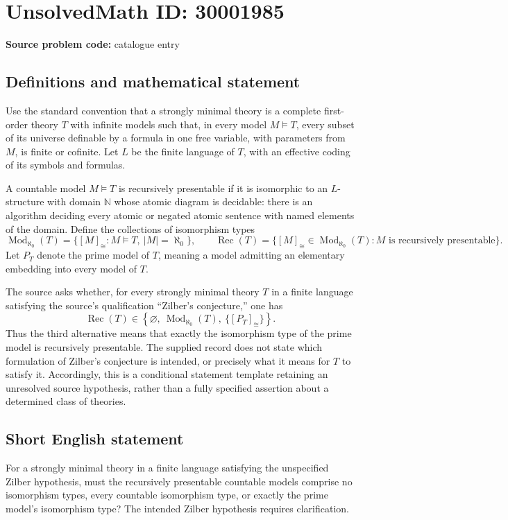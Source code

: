 \documentclass[11pt]{article}
\newcommand{\N}{\mathbb{N}}
\begin{document}
\section*{UnsolvedMath ID: 30001985}
\textbf{Source problem code:} catalogue entry
\subsection{Definitions and mathematical statement}
Use the standard convention that a strongly minimal theory is a complete first-order theory \(T\) with infinite models such that, in every model \(M\models T\), every subset of its universe definable by a formula in one free variable, with parameters from \(M\), is finite or cofinite. Let \(L\) be the finite language of \(T\), with an effective coding of its symbols and formulas.

A countable model \(M\models T\) is recursively presentable if it is isomorphic to an \(L\)-structure with domain \(\N\) whose atomic diagram is decidable: there is an algorithm deciding every atomic or negated atomic sentence with named elements of the domain. Define the collections of isomorphism types
\[
\operatorname{Mod}_{\aleph_0}(T)=\{[M]_{\cong}:M\models T,\ |M|=\aleph_0\},
\qquad
\operatorname{Rec}(T)=\{[M]_{\cong}\in\operatorname{Mod}_{\aleph_0}(T):M\text{ is recursively presentable}\}.
\]
Let \(P_T\) denote the prime model of \(T\), meaning a model admitting an elementary embedding into every model of \(T\).

The source asks whether, for every strongly minimal theory \(T\) in a finite language satisfying the source's qualification ``Zilber's conjecture,'' one has
\[
\operatorname{Rec}(T)\in
\left\{\varnothing,\ \operatorname{Mod}_{\aleph_0}(T),\ \{[P_T]_{\cong}\}\right\}.
\]
Thus the third alternative means that exactly the isomorphism type of the prime model is recursively presentable. The supplied record does not state which formulation of Zilber's conjecture is intended, or precisely what it means for \(T\) to satisfy it. Accordingly, this is a conditional statement template retaining an unresolved source hypothesis, rather than a fully specified assertion about a determined class of theories.
\subsection{Short English statement}
For a strongly minimal theory in a finite language satisfying the unspecified Zilber hypothesis, must the recursively presentable countable models comprise no isomorphism types, every countable isomorphism type, or exactly the prime model's isomorphism type? The intended Zilber hypothesis requires clarification.
\end{document}
